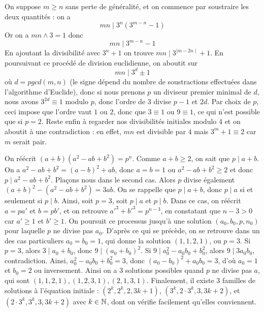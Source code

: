 \begin{sol}
On suppose $m\ge n$ sans perte de généralité, et on commence par soustraire les deux quantités : on a $$mn\mid 3^{n}(3^{m-n}-1)$$
Or on a $mn\wedge 3=1$ donc
$$mn\mid 3^{m-n}-1$$
En ajoutant la divisibilité avec $3^n+1$ on trouve
$mn\mid 3^{\mid m-2n\mid}+1$.\newline
En poursuivant ce procédé de division euclidienne, on aboutit sur $$mn\mid 3^d\pm1$$ où $d=pgcd(m,n)$ (le signe dépend du nombre de soustractions effectuées dans l'algorithme d'Euclide), donc si nous prenons $p$ un diviseur premier minimal de $d$, nous avons $3^{2d}\equiv 1$ modulo $p$, donc l'ordre de $3$ divise $p-1$ et $2d$. Par choix de $p$, ceci impose que l'ordre vaut $1$ ou $2$, donc que $3\equiv 1$ ou $9\equiv 1$, ce qui n'est possible que si $p=2$. Reste enfin à regarder nos divisibilités initiales modulo 4 et on aboutit à une contradiction : en effet, $mn$ est divisible par $4$ mais $3^m+1\equiv 2$ car $m$ serait pair.
\end{sol}


\begin{sol}
On réécrit $(a+b)(a^2-ab+b^2)=p^n$. Comme $a+b\ge 2$, on sait que $p\mid a+b$. On a $a^2-ab+b^2=(a-b)^2+ab$, donc $a=b=1$ ou $a^2-ab+b^2\ge 2$ et donc $p\mid a^2-ab+b^2$. Plaçons nous dans le second cas. Alors $p$ divise également $(a+b)^2-(a^2-ab+b^2)=3ab$. On se rappelle que $p\mid a+b$, donc $p\mid a$ si et seulement si $p\mid b$.
Ainsi, soit $p=3$, soit $p\mid a$ et $p\mid b$. Dans ce cas, on réécrit $a=pa'$ et $b=pb'$, et on retrouve $a'^3+b'^3=p^{n -3}$, en constatant que $n-3>0$ car $a'\ge 1$ et $b'\ge 1$. On poursuit ce processus jusqu'à une solution $(a_0,b_0,p,n_0)$ pour laquelle $p$ ne divise pas $a_0$. D'après ce qui se précède, on se retrouve dans un des cas particuliers $a_0=b_0=1$, qui donne la solution $(1,1,2,1)$, ou $p=3$. Si $p=3$, alors $3\mid a_0+b_0$, donc $9\mid (a_0+b_0)^2$. Si $9\mid a_0^2-a_0b_0+b_0^2$, alors $9\mid 3a_0b_0$, contradiction. Ainsi, $a_0^2-a_0b_0+b_0^2=3$, donc $(a_0-b_0)^2+a_0b_0=3$, d'où $a_0=1$ et $b_0=2$ ou inversement.
\newline Ainsi on a $3$ solutions possibles quand $p$ ne divise pas $a$, qui sont $(1,1,2,1),(1,2,3,1),(2,1,3,1)$. Finalement, il existe $3$ familles de solutions à l'équation initiale : $(2^k,2^k,2,3k+1)$, $(3^k,2\cdot 3^k,3,3k+2)$, et $(2\cdot 3^k,3^k,3,3k+2)$ avec $k\in\mathbb N$, dont on vérifie facilement qu'elles conviennent.
\end{sol}


